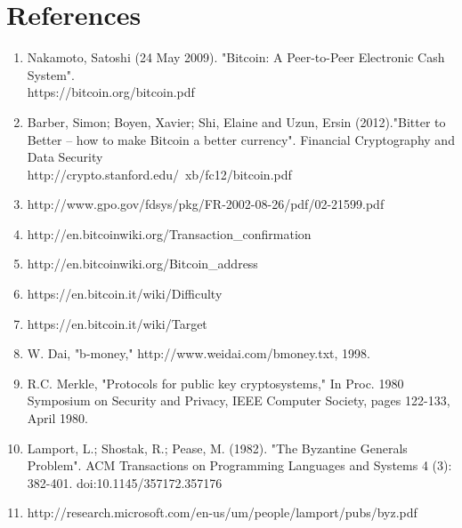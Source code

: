 \documentclass[pdftex,11pt]{article}
\begin{document}
\section{References}

\begin{enumerate}
\item Nakamoto, Satoshi (24 May 2009). "Bitcoin: A Peer-to-Peer Electronic Cash System". \\ https://bitcoin.org/bitcoin.pdf

\item Barber, Simon; Boyen, Xavier; Shi, Elaine and Uzun, Ersin (2012)."Bitter to Better -- how to make Bitcoin a better currency". Financial Cryptography and Data Security \\http://crypto.stanford.edu/~xb/fc12/bitcoin.pdf

\item http://www.gpo.gov/fdsys/pkg/FR-2002-08-26/pdf/02-21599.pdf

\item http://en.bitcoinwiki.org/Transaction\_confirmation
\item http://en.bitcoinwiki.org/Bitcoin\_address
\item https://en.bitcoin.it/wiki/Difficulty
\item https://en.bitcoin.it/wiki/Target
\item W. Dai, "b-money," http://www.weidai.com/bmoney.txt, 1998.
\item R.C. Merkle, "Protocols for public key cryptosystems," In Proc. 1980 Symposium on Security and Privacy, IEEE Computer Society, pages 122-133, April 1980.
\item Lamport, L.; Shostak, R.; Pease, M. (1982). "The Byzantine Generals Problem". ACM Transactions on Programming Languages and Systems 4 (3): 382-401. doi:10.1145/357172.357176
\item http://research.microsoft.com/en-us/um/people/lamport/pubs/byz.pdf
\end{enumerate}
\end{document}
